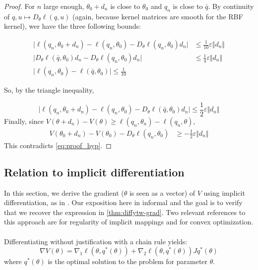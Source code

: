 \begin{proof}
   For $n$ large enough, $\theta_0 + d_n$ is close to $\theta_0$ and $q_n$ is close to $\bar q$. By continuity of $q, u \mapsto D_\theta\ell(q, u)$ (again, because kernel matrices are smooth for the RBF kernel), wer have the three following bounds:

   \begin{align}
       \vert \ell(q_n, \theta_0 + d_n) - \ell(q_n, \theta_0) - D_\theta \ell(q_n, \theta_0)d_n\vert &\leq \frac{1}{10} \varepsilon \Vert d_n \Vert\\
        \vert D_\theta \ell(\bar q, \theta_0)d_n - D_\theta \ell(q_n, \theta_0)d_n\vert &\leq \frac{1}{4}\varepsilon \Vert d_n \Vert\\
        \vert \ell(q_n, \theta_0) - \ell(\bar q, \theta_0) \vert \leq \frac{1}{10}
    \end{align}

    So, by the triangle inequality,

    \begin{equation}
       \vert \ell(q_n, \theta_0 + d_n) - \ell(q_n, \theta_0) - D_\theta \ell(\bar q, \theta_0)d_n\vert \leq \frac{1}{2} \varepsilon \Vert d_n \Vert
    \end{equation}
    Finally, since $V(\theta + d_n) - V(\theta) \geq \ell(q_n, \theta_n) - \ell(q_n, \theta)$,
    \begin{align}
        V(\theta_0 + d_n) - V(\theta_0) - D_\theta \ell(q_n, \theta_0)&\geq-\frac{1}{2}\varepsilon\Vert d_n\Vert
    \end{align}
    This contradicts \cref{eq:proof_hyp}.
\end{proof}






\subsection{Relation to implicit differentiation}\label{sec:lagrangian}
In this section, we derive the gradient ($\theta$ is seen as a vector) of $V$ using implicit differentiation, as in \citet{optnet}. Our exposition here in informal and the goal is to verify that we recover the expression in \cref{thm:diffytw-grad}.
Two relevant references to this approach are \cite{rockafellar} for regularity of implicit mappings and \cite{convex-optimization} for convex optimization.

\paragraph{}
Differentiating without justification with a chain rule yields:
\begin{equation}\label{eq:lagrangian-first}
    \nabla V(\theta) = \nabla_1 \ell(\theta, q^*(\theta)) + \nabla_2 \ell(\theta, q^*(\theta))J q^*(\theta)
\end{equation}
where $q^*(\theta)$ is the optimal solution to the problem for parameter $\theta$.

